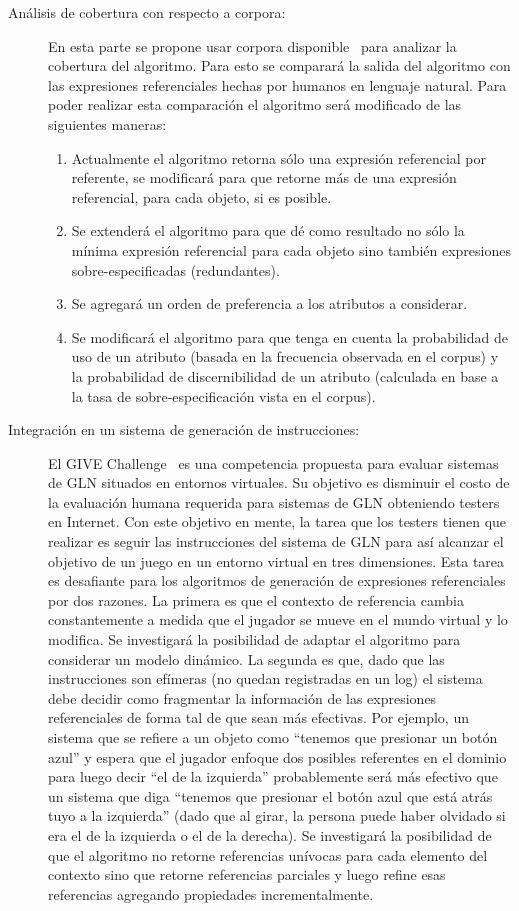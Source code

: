 \begin{description}
\item[An\'alisis de cobertura con respecto a corpora:] En esta parte se propone usar corpora disponible~\cite{viethen-dale:2011:UCNLG+Eval} para analizar la cobertura del algoritmo. Para esto se comparar\'a la salida del algoritmo con las expresiones referenciales hechas por humanos en lenguaje natural. Para poder realizar esta comparaci\'on el algoritmo ser\'a modificado de las siguientes maneras:
\begin{enumerate}
   \item Actualmente el algoritmo retorna s\'olo una expresi\'on referencial por referente, se modificar\'a para que retorne m\'as de una expresi\'on referencial, para cada objeto, si es posible.
   \item Se extender\'a el algoritmo para que d\'e como resultado no s\'olo la m\'inima expresi\'on referencial para cada objeto sino tambi\'en expresiones sobre-especificadas (redundantes).
   \item Se agregar\'a un orden de preferencia a los atributos a considerar.
   \item Se modificar\'a el algoritmo para que tenga en cuenta la probabilidad de uso de un atributo (basada en la frecuencia observada en el corpus) y la probabilidad de discernibilidad de un atributo (calculada en base a la tasa de sobre-especificaci\'on vista en el corpus).
\end{enumerate}
\item[Integraci\'on en un sistema de generaci\'on de instrucciones:] El GIVE Challenge~\cite{KolByrCasDalStrMooObe09} es una competencia propuesta para evaluar sistemas de GLN situados en entornos virtuales. Su objetivo es disminuir el costo de la evaluaci\'on humana requerida para sistemas de GLN obteniendo testers en Internet. Con este objetivo en mente, la tarea que los testers tienen que realizar es seguir las instrucciones del sistema de GLN para as\'i alcanzar el objetivo de un juego en un entorno virtual en tres dimensiones. Esta tarea es desafiante para los algoritmos de generaci\'on de expresiones referenciales por dos razones. La primera es que el contexto de referencia cambia constantemente a medida que el jugador se mueve en el mundo virtual y lo modifica. Se investigar\'a la posibilidad de adaptar el algoritmo para considerar un modelo din\'amico. La segunda es que, dado que las instrucciones son ef\'imeras (no quedan registradas en un log) el sistema debe decidir como fragmentar la informaci\'on de las expresiones referenciales de forma tal de que sean m\'as efectivas. Por ejemplo, un sistema que se refiere a un objeto como ``tenemos que presionar un bot\'on azul'' y espera que el jugador enfoque dos posibles referentes en el dominio para luego decir ``el de la izquierda'' probablemente ser\'a m\'as efectivo que un sistema que diga ``tenemos que presionar el bot\'on azul que est\'a atr\'as tuyo a la izquierda'' (dado que al girar, la persona puede haber olvidado si era el de la izquierda o el de la derecha). Se investigar\'a la posibilidad de que el algoritmo no retorne referencias un\'ivocas para cada elemento del contexto sino que retorne referencias parciales y luego refine esas referencias agregando propiedades incrementalmente. 
\end{description}

